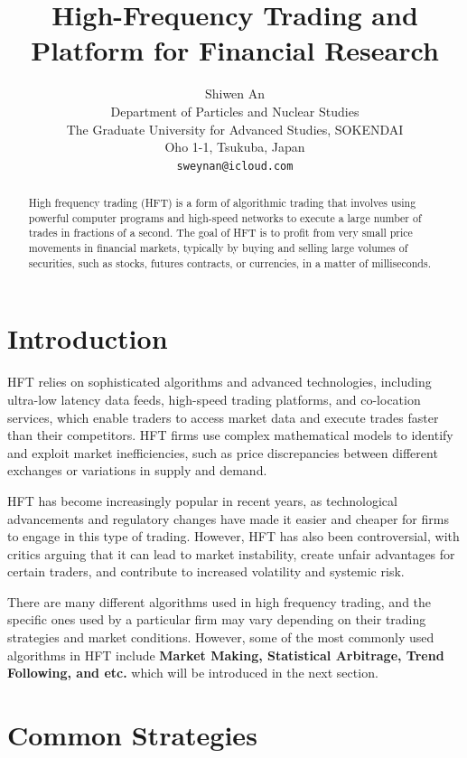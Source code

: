 \documentclass{article}
\title{High-Frequency Trading and Platform for Financial Research}
\author{ 
	Shiwen An \\
	Department of Particles and Nuclear Studies\\
	The Graduate University for Advanced Studies, SOKENDAI\\
	Oho 1-1, Tsukuba, Japan \\
	\texttt{sweynan@icloud.com} \\
}
\begin{document}
\maketitle

\begin{abstract}
	High frequency trading (HFT) is a form of algorithmic trading that involves using powerful computer programs and high-speed networks to execute a large number of trades in fractions of a second. The goal of HFT is to profit from very small price movements in financial markets, typically by buying and selling large volumes of securities, such as stocks, futures contracts, or currencies, in a matter of milliseconds.
\end{abstract}




\section{Introduction}
HFT relies on sophisticated algorithms and advanced technologies, including ultra-low latency data feeds, high-speed trading platforms, and co-location services, which enable traders to access market data and execute trades faster than their competitors. HFT firms use complex mathematical models to identify and exploit market inefficiencies, such as price discrepancies between different exchanges or variations in supply and demand.

HFT has become increasingly popular in recent years, as technological advancements and regulatory changes have made it easier and cheaper for firms to engage in this type of trading. However, HFT has also been controversial, with critics arguing that it can lead to market instability, create unfair advantages for certain traders, and contribute to increased volatility and systemic risk.

There are many different algorithms used in high frequency trading, and the specific ones used by a particular firm may vary depending on their trading strategies and market conditions. However, some of the most commonly used algorithms in HFT include \textbf{Market Making, Statistical Arbitrage, Trend Following, and etc. } which will be introduced in the next section. 

\section{Common Strategies}
\end{document}
